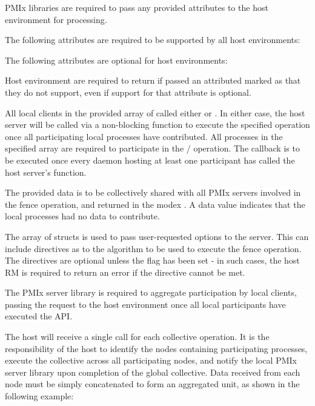 \reqattrstart
\ac{PMIx} libraries are required to pass any provided attributes to the host environment for processing.

The following attributes are required to be supported by all host environments:


\reqattrend

\optattrstart
The following attributes are optional for host environments:


\optattrend

\advicermstart
Host environment are required to return  if passed an attributed marked as  that they do not support, even if support for that attribute is optional.
\advicermend

\descr

All local clients in the provided array of  called either  or .
In either case, the host server will be called via a non-blocking function to execute the specified operation once all participating local processes have contributed.
All processes in the specified  array are required to participate in the / operation.
The callback is to be executed once every daemon hosting at least one participant has called the host server's  function.

The provided data is to be collectively shared with all \ac{PMIx} servers involved in the fence operation, and returned in the modex .
A  data value indicates that the local processes had no data to contribute.

The array of  structs is used to pass user-requested options to the server.
This can include directives as to the algorithm to be used to execute the fence operation.
The directives are optional unless the  flag has been set - in such cases, the host \ac{RM} is required to return an error if the directive cannot be met.

\adviceimplstart
The \ac{PMIx} server library is required to aggregate participation by local clients, passing the request to the host environment once all local participants have executed the \ac{API}.
\adviceimplend

\advicermstart
The host will receive a single call for each collective operation. It is the responsibility of the host to identify the nodes containing participating processes, execute the collective across all participating nodes, and notify the local \ac{PMIx} server library upon completion of the global collective. Data received from each node must be simply concatenated to form an aggregated unit, as shown in the following example:

